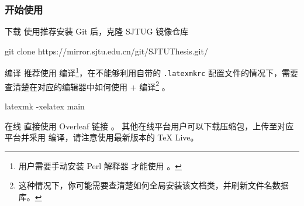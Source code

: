 \begin{frame}
  \frametitle{开始使用}
  \alert{下载} 使用推荐安装 Git  后，克隆 SJTUG 镜像仓库
  \begin{exampleblock}{\faGit*}
    \ttfamily\small
    git clone https://mirror.sjtu.edu.cn/git/SJTUThesis.git/
  \end{exampleblock}

  \alert{编译} 推荐使用  编译\footnote{ 用户需要手动安装 Perl 解释器  才能使用 。}，在不能够利用自带的 \texttt{.latexmkrc} 配置文件的情况下，需要查清楚在对应的编辑器中如何使用  +  编译\footnote{这种情况下，你可能需要查清楚如何全局安装该文档类，并刷新文件名数据库。} 。
  \begin{exampleblock}{\faTerminal}
    \ttfamily\small
    latexmk -xelatex main
  \end{exampleblock}

  \alert{在线} 直接使用 Overleaf 链接 。
  其他在线平台用户可以下载压缩包，上传至对应平台并采用  编译，请注意使用最新版本的 \TeX{} Live。
\end{frame}

